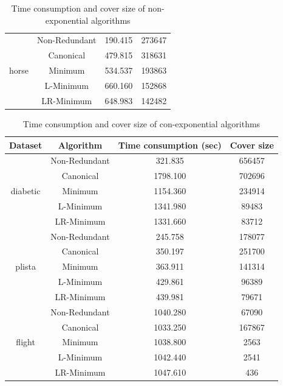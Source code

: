 \documentclass[11pt]{book}
\begin{document}
\begin{table}[H]
\begin{tabular}{|c|c|c|c|}
    \hline
    \multirow{5}{*}{horse}
    	& Non-Redundant & 190.415 & 273647  \\
    	& Canonical     & 479.815 & 318631  \\
    	& Minimum       & 534.537 & 193863   \\
    	& L-Minimum     & 660.160 & 152868   \\
    	& LR-Minimum    & 648.983 & 142482   \\	
    	
    \hline
    
\end{tabular}

	\caption{Time consumption and cover size of non-exponential algorithms}
	
\end{table}

\begin{table}[H]

	\centering
	
\begin{tabular}{|c|c|c|c|}

    \hline
    Dataset & Algorithm & Time consumption (sec) & Cover size \\
    
    \hline
    \multirow{5}{*}{diabetic}
    	& Non-Redundant & 321.835  & 656457 \\
    	& Canonical     & 1798.100 & 702696 \\
    	& Minimum       & 1154.360 & 234914 \\
    	& L-Minimum     & 1341.980 & 89483  \\
    	& LR-Minimum    & 1331.660 & 83712  \\	

    \hline
    \multirow{5}{*}{plista}
    	& Non-Redundant & 245.758 & 178077 \\
    	& Canonical     & 350.197 & 251700 \\
    	& Minimum       & 363.911 & 141314 \\
    	& L-Minimum     & 429.861 & 96389  \\
    	& LR-Minimum    & 439.981 & 79671  \\
    	
    \hline
    \multirow{5}{*}{flight}
    	& Non-Redundant & 1040.280 & 67090  \\
    	& Canonical     & 1033.250 & 167867 \\
    	& Minimum       & 1038.800 & 2563   \\
    	& L-Minimum     & 1042.440 & 2541   \\
    	& LR-Minimum    & 1047.610 & 436    \\
    	
    \hline
    
\end{tabular}

	\caption{Time consumption and cover size of con-exponential algorithms}
	
\end{table}
\end{document}
